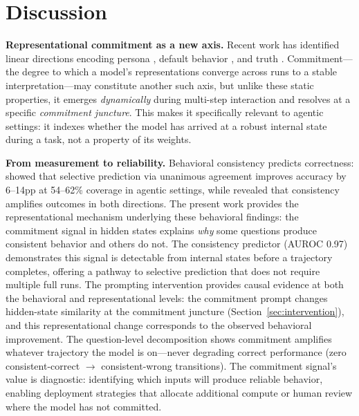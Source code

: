 \documentclass{article}
\begin{document}
\section{Discussion}

\textbf{Representational commitment as a new axis.} Recent work has identified linear directions encoding persona \citep{anthropic_persona}, default behavior \citep{anthropic_axis}, and truth \citep{marks2024geometry}. Commitment---the degree to which a model's representations converge across runs to a stable interpretation---may constitute another such axis, but unlike these static properties, it emerges \emph{dynamically} during multi-step interaction and resolves at a specific \emph{commitment juncture}. This makes it specifically relevant to agentic settings: it indexes whether the model has arrived at a robust internal state during a task, not a property of its weights.

\textbf{From measurement to reliability.} Behavioral consistency predicts correctness: \citet{anonymous2026a} showed that selective prediction via unanimous agreement improves accuracy by 6--14pp at 54--62\% coverage in agentic settings, while \citet{anonymous2026b} revealed that consistency amplifies outcomes in both directions. The present work provides the representational mechanism underlying these behavioral findings: the commitment signal in hidden states explains \emph{why} some questions produce consistent behavior and others do not. The consistency predictor (AUROC 0.97) demonstrates this signal is detectable from internal states before a trajectory completes, offering a pathway to selective prediction that does not require multiple full runs. The prompting intervention provides causal evidence at both the behavioral and representational levels: the commitment prompt changes hidden-state similarity at the commitment juncture (Section~\ref{sec:intervention}), and this representational change corresponds to the observed behavioral improvement. The question-level decomposition shows commitment amplifies whatever trajectory the model is on---never degrading correct performance (zero consistent-correct $\to$ consistent-wrong transitions). The commitment signal's value is diagnostic: identifying which inputs will produce reliable behavior, enabling deployment strategies that allocate additional compute or human review where the model has not committed.
\end{document}
